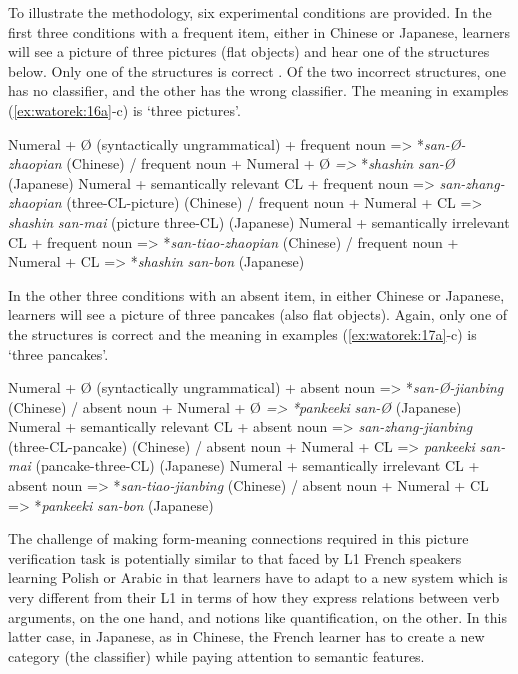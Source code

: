 \documentclass[output=paper,colorlinks,citecolor=brown,modfonts,nonflat]{../langscibook}
\begin{document}
To illustrate the methodology, six experimental conditions are provided. In the first three conditions with a frequent item, either in Chinese or Japanese, learners will see a picture of three pictures (flat objects) and hear one of the structures below. Only one of the structures is correct . Of the two incorrect structures, one has no classifier, and the other has the wrong classifier. The meaning in examples (\ref{ex:watorek:16a}-c) is ‘three pictures’.

\ea%
    \label{ex:watorek:16}
    \ea%
    \label{ex:watorek:16a}
    Numeral + Ø (syntactically ungrammatical) + frequent noun => *\textit{san-Ø-zhaopian} (Chinese) /  frequent noun + Numeral + Ø  \textit{=>} *\textit{shashin} \textit{san-Ø} (Japanese)
    \ex%
    \label{ex:watorek:16b}
    Numeral + semantically relevant CL + frequent noun => \textit{san-zhang-zhaopian} (three-CL-picture) (Chinese) / frequent noun + Numeral + CL => \textit{shashin} \textit{san-mai} (picture three-CL) (Japanese)
    \ex%
    \label{ex:watorek:16c}
    Numeral + semantically irrelevant CL + frequent noun => *\textit{san-tiao-zhaopian} (Chinese) / frequent noun + Numeral + CL => *\textit{shashin} \textit{san-bon} (Japanese)
    \z
\z

In the other three conditions with an absent item, in either Chinese or Japanese, learners will see a picture of three pancakes (also flat objects). Again, only one of the structures is correct  and the meaning in examples (\ref{ex:watorek:17a}-c) is ‘three pancakes’.

\ea%
    \label{ex:watorek:17}
    \ea%
    \label{ex:watorek:17a}
    Numeral + Ø (syntactically ungrammatical) + absent noun => *\textit{san-Ø-jianbing} (Chinese) / absent noun + Numeral + Ø \textit{=>} \textit{*pankeeki} \textit{san-Ø} (Japanese)
    \ex%
    \label{ex:watorek:17b}
    Numeral + semantically relevant CL + absent noun => \textit{san-zhang-jianbing} (three-CL-pancake) (Chinese) / absent noun + Numeral + CL => \textit{pankeeki} \textit{san-mai} (pancake-three-CL) (Japanese)
    \ex%
    \label{ex:watorek:17c}
    Numeral + semantically irrelevant CL + absent noun => *\textit{san-tiao-jianbing} (Chinese) / absent noun + Numeral + CL => *\textit{pankeeki} \textit{san-bon} (Japanese)
    \z
\z

The challenge of making form-meaning connections required in this picture verification task is potentially similar to that faced by L1 French speakers learning Polish or Arabic in that learners have to adapt to a new system which is very different from their L1 in terms of how they express relations between verb arguments, on the one hand, and notions like quantification, on the other. In this latter case, in Japanese, as in Chinese, the French learner has to create a new category (the classifier) while paying attention to semantic features. 
\end{document}
